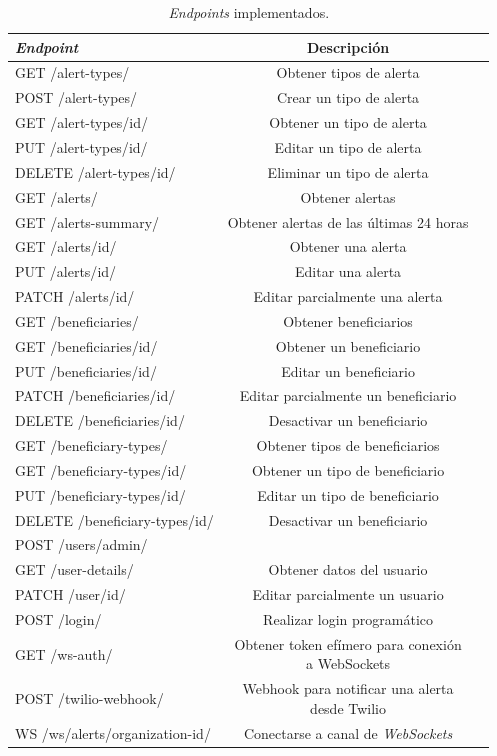 \begin{table}[H]
	\centering
	\caption[\textit{Endpoints} implementados.]{\textit{Endpoints} implementados.}
	\begin{tabular}{l c c}    
		\toprule
		\textbf{\textit{Endpoint}} 	 & \textbf{Descripción} \\
		\midrule
		GET /alert-types/ & Obtener tipos de alerta  \\		
		POST /alert-types/& Crear un tipo de alerta		\\		
		GET /alert-types/{id}/ & Obtener un tipo de alerta \\
		PUT /alert-types/{id}/ & Editar un tipo de alerta		\\
		DELETE /alert-types/{id}/ & Eliminar un tipo de alerta  \\
		\hline
		GET /alerts/ & Obtener alertas  \\		
		GET /alerts-summary/ & Obtener alertas de las últimas 24 horas \\		
		GET /alerts/{id}/ & Obtener una alerta \\
		PUT /alerts/{id}/ & Editar una alerta		\\
		PATCH /alerts/{id}/ & Editar parcialmente una alerta   \\
		\hline
		GET /beneficiaries/ & Obtener beneficiarios  \\			
		GET /beneficiaries/{id}/ & Obtener un beneficiario \\
		PUT /beneficiaries/{id}/ & Editar un beneficiario		\\
		PATCH /beneficiaries/{id}/ & Editar parcialmente un beneficiario   \\
		DELETE /beneficiaries/{id}/ & Desactivar un beneficiario \\
		\hline
		GET /beneficiary-types/ & Obtener tipos de beneficiarios  \\			
		GET /beneficiary-types/{id}/ & Obtener un tipo de beneficiario \\
		PUT /beneficiary-types/{id}/ & Editar un tipo de beneficiario		\\
		DELETE /beneficiary-types/{id}/ & Desactivar un beneficiario \\
		\hline
		POST /users/admin/ & \makecell{Crear un usuario administrador}  \\			
		GET /user-details/ & Obtener datos del usuario \\
		PATCH /user/{id}/ & Editar parcialmente un usuario \\
		\hline
		POST /login/ & Realizar login programático \\	
		GET /ws-auth/ & \makecell{Obtener token efímero para  conexión \\ a WebSockets} \\
		POST /twilio-webhook/ & \makecell{Webhook para notificar una  alerta \\ desde Twilio} \\	
		WS /ws/alerts/organization-{id}/ & Conectarse a canal de \textit{WebSockets}	\\
		\bottomrule
		\hline
	\end{tabular}
	\label{tab:endpoints}
\end{table}

